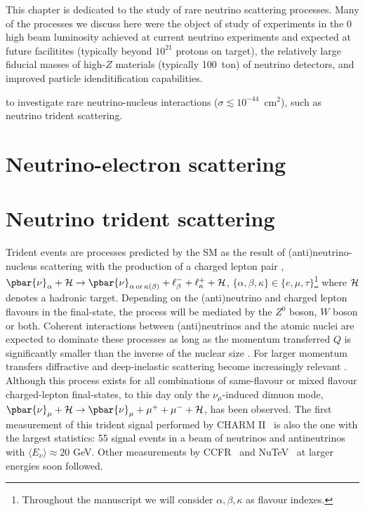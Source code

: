 \graphicspath{{}{tridentSM/figs/}{tridentSM/}}

This chapter is dedicated to the study of rare neutrino scattering processes. Many of the processes we discuss here were the object of study of experiments in the 0  high beam luminosity achieved at current neutrino experiments and expected at future facilitites (typically beyond $10^{21}$ protons on target), the relatively large fiducial masses of high-$Z$ materials (typically 100~ton) of neutrino detectors, and improved particle idenditification capabilities. 

  to investigate rare neutrino-nucleus interactions ($\sigma\lesssim 10^{-44}$~cm${}^2$), such as neutrino trident scattering. 

\section{Neutrino-electron scattering}


\section{Neutrino trident scattering}



Trident events are processes predicted by the SM as the result of (anti)neutrino-nucleus scattering with the production of a charged lepton pair \cite{Czyz:1964zz,Lovseth:1971vv,Fujikawa:1971nx,Brown:1971qr,Koike:1971tu}, $\pbar{\nu}_{\alpha}+{\cal{H}} \to \pbar{\nu}_{\alpha \,{\rm{or}} \, \kappa(\beta)} + \ell_{\beta}^- + \ell_\kappa^+ +{\cal{H}}$, $\{\alpha,\beta,\kappa\}\in \{e,\mu,\tau\}$\footnote{Throughout the manuscript we will consider ${\alpha,\beta, \kappa}$ as flavour indexes.} where $\cal{H}$ denotes a hadronic target. Depending on the (anti)neutrino and charged lepton flavours in the final-state, the process will be mediated by the $Z^0$ boson, $W$ boson or both. Coherent interactions between (anti)neutrinos and the atomic nuclei are expected to dominate these processes as long as the momentum transferred $Q$ is significantly smaller than the inverse of the nuclear size \cite{Czyz:1964zz}. For larger momentum transfers diffractive and deep-inelastic scattering become increasingly relevant \cite{Magill:2016hgc}.
%
Although this process exists for all combinations of same-flavour or mixed flavour charged-lepton final-states, to this day only the $\nu_\mu$-induced dimuon mode, $\pbar{\nu}_\mu + {\cal{H}} \to \pbar{\nu}_\mu  + \mu^+ + \mu^- + {\cal{H}}$, has been observed. The first measurement of this trident signal performed by CHARM II~\cite{Geiregat:1990gz} is also the one with the largest statistics: 55 signal events in a beam of neutrinos and antineutrinos with $\langle E_\nu \rangle \approx 20$ GeV. Other measurements by CCFR~\cite{Mishra:1991bv} and NuTeV~\cite{Adams:1998yf} at larger energies soon followed.

